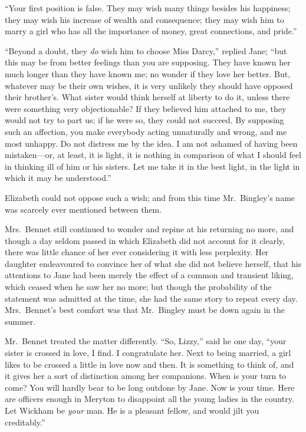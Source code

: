 \documentclass[12pt,english,oneside]{book}
\begin{document}
{}``Your first position is false. They may wish many things besides
his happiness; they may wish his increase of wealth and consequence;
they may wish him to marry a girl who has all the importance of money,
great connections, and pride.''

{}``Beyond a doubt, they \textit{do} wish him to choose Miss Darcy,''
replied Jane; {}``but this may be from better feelings than you are
supposing. They have known her much longer than they have known me;
no wonder if they love her better. But, whatever may be their own
wishes, it is very unlikely they should have opposed their brother's.
What sister would think herself at liberty to do it, unless there
were something very objectionable? If they believed him attached to
me, they would not try to part us; if he were so, they could not succeed.
By supposing such an affection, you make everybody acting unnaturally
and wrong, and me most unhappy. Do not distress me by the idea. I
am not ashamed of having been mistaken\mbox{---}or, at least, it
is light, it is nothing in comparison of what I should feel in thinking
ill of him or his sisters. Let me take it in the best light, in the
light in which it may be understood.''

Elizabeth could not oppose such a wish; and from this time Mr.\ Bingley's
name was scarcely ever mentioned between them.

Mrs.\ Bennet still continued to wonder and repine at his returning
no more, and though a day seldom passed in which Elizabeth did not
account for it clearly, there was little chance of her ever considering
it with less perplexity. Her daughter endeavoured to convince her
of what she did not believe herself, that his attentions to Jane had
been merely the effect of a common and transient liking, which ceased
when he saw her no more; but though the probability of the statement
was admitted at the time, she had the same story to repeat every day.
Mrs.\ Bennet's best comfort was that Mr.\ Bingley must be down again
in the summer.

Mr.\ Bennet treated the matter differently. {}``So, Lizzy,'' said
he one day, {}``your sister is crossed in love, I find. I congratulate
her. Next to being married, a girl likes to be crossed a little in
love now and then. It is something to think of, and it gives her a
sort of distinction among her companions. When is your turn to come?
You will hardly bear to be long outdone by Jane. Now is your time.
Here are officers enough in Meryton to disappoint all the young ladies
in the country. Let Wickham be \textit{your} man. He is a pleasant
fellow, and would jilt you creditably.''
\end{document}
